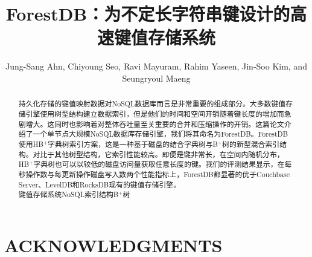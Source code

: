 \documentclass[lang=cn]{cls/elegantpaper}
\title{ForestDB：为不定长字符串键设计的高速键值存储系统}
\author{Jung-Sang Ahn, Chiyoung Seo, Ravi Mayuram, Rahim Yaseen, Jin-Soo Kim, and Seungryoul Maeng}
\begin{document}
\maketitle

\begin{abstract}
\noindent \sffamily 持久化存储的键值映射数据对NoSQL数据库而言是非常重要的组成部分。大多数键值存储引擎使用树型结构建立数据索引，但是他们的时间和空间开销随着键长度的增加而急剧增大。这同时也影响着对整体吞吐量至关重要的合并和压缩操作的开销。这篇论文介绍了一个单节点大规模NoSQL数据库存储引擎，我们将其命名为ForestDB。ForestDB使用HB$^+$字典树索引方案，这是一种基于磁盘的结合字典树与B$^+$树的新型混合索引结构。对比于其他树型结构，它索引性能较高。即便是键非常长，在空间内随机分布，HB$^+$字典树也可以以较低的磁盘访问量获取任意长度的键。我们的评测结果显示，在每秒操作数与每更新操作磁盘写入数两个性能指标上，ForestDB都显著的优于Couchbase Server、LevelDB和RocksDB现有的键值存储引擎。\\

\noindent {} 键值存储系统\quad NoSQL\quad 索引结构\quad B$^+$树
\end{abstract}







\section{ACKNOWLEDGMENTS}


\end{document}
